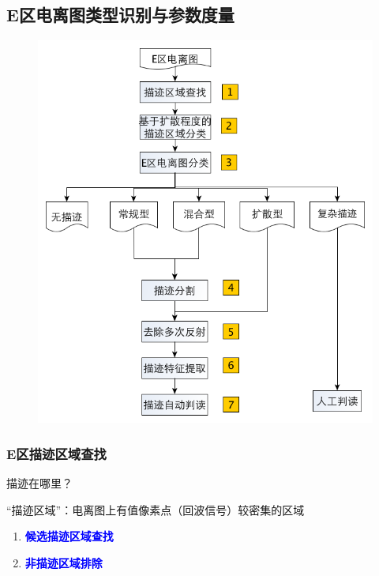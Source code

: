 \documentclass[notheorems,mathserif,table,compress]{beamer}  %
\begin{document}
\subsection{E区电离图类型识别与参数度量}
\begin{frame}
 \begin{figure}[ht!]
    \centering
  \includegraphics[width=0.55\linewidth]{E区描迹度量方案修改版.png}
 \end{figure}
 
\end{frame}

\begin{frame}
\frametitle{ E区描迹区域查找}
\begin{tcolorbox}[colback=blue!5,colframe=blue!75!black]
\begin{description}
\vspace{-0.5em}
\addtolength{\itemindent}{-4em}
\item[目的] 描迹在哪里？
\item[依据] “描迹区域”：电离图上有值像素点（回波信号）较密集的区域
\item[算法] \mbox{}
\begin{enumerate}
\item \textcolor{blue}{\textbf{候选描迹区域查找}}
\item \textcolor{blue}{\textbf{非描迹区域排除}}
\end{enumerate}
\end{description}
\end{tcolorbox}
\end{frame}
\end{document}
